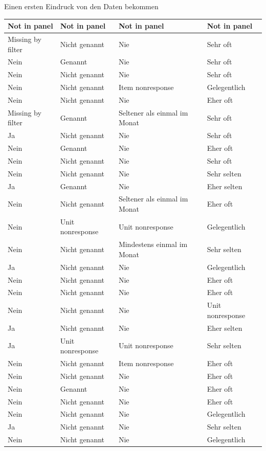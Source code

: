 \documentclass[ignorenonframetext,]{beamer}
\begin{document}
\begin{frame}{Einen ersten Eindruck von den Daten bekommen}
\begin{tabular}{l|l|l|l}
\hline
Not in panel & Not in panel & Not in panel & Not in panel\\
\hline
Missing by filter & Nicht genannt & Nie & Sehr oft\\
\hline
Nein & Genannt & Nie & Sehr oft\\
\hline
Nein & Nicht genannt & Nie & Sehr oft\\
\hline
Nein & Nicht genannt & Item nonresponse & Gelegentlich\\
\hline
Nein & Nicht genannt & Nie & Eher oft\\
\hline
Missing by filter & Genannt & Seltener als einmal im Monat & Sehr oft\\
\hline
Ja & Nicht genannt & Nie & Sehr oft\\
\hline
Nein & Genannt & Nie & Eher oft\\
\hline
Nein & Nicht genannt & Nie & Sehr oft\\
\hline
Nein & Nicht genannt & Nie & Sehr selten\\
\hline
Ja & Genannt & Nie & Eher selten\\
\hline
Nein & Nicht genannt & Seltener als einmal im Monat & Eher oft\\
\hline
Nein & Unit nonresponse & Unit nonresponse & Gelegentlich\\
\hline
Nein & Nicht genannt & Mindestens einmal im Monat & Sehr selten\\
\hline
Ja & Nicht genannt & Nie & Gelegentlich\\
\hline
Nein & Nicht genannt & Nie & Eher oft\\
\hline
Nein & Nicht genannt & Nie & Eher oft\\
\hline
Nein & Nicht genannt & Nie & Unit nonresponse\\
\hline
Ja & Nicht genannt & Nie & Eher selten\\
\hline
Ja & Unit nonresponse & Unit nonresponse & Sehr selten\\
\hline
Nein & Nicht genannt & Item nonresponse & Eher oft\\
\hline
Nein & Nicht genannt & Nie & Eher oft\\
\hline
Nein & Genannt & Nie & Eher oft\\
\hline
Nein & Nicht genannt & Nie & Eher oft\\
\hline
Nein & Nicht genannt & Nie & Gelegentlich\\
\hline
Ja & Nicht genannt & Nie & Sehr selten\\
\hline
Nein & Nicht genannt & Nie & Gelegentlich\\

\end{tabular}
\end{frame}
\end{document}
